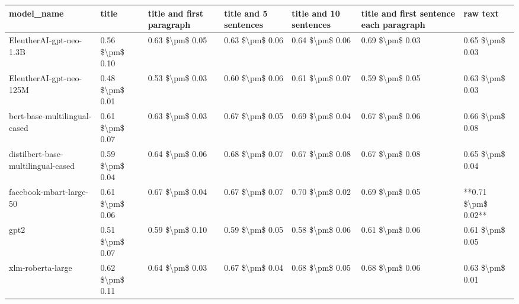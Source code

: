 \begin{tabular}{lllllll}
\toprule
                        model\_name &           title & title and first paragraph & title and 5 sentences & title and 10 sentences & title and first sentence each paragraph &            raw text \\
\midrule
           EleutherAI-gpt-neo-1.3B & 0.56 \$\textbackslash pm\$ 0.10 &           0.63 \$\textbackslash pm\$ 0.05 &       0.63 \$\textbackslash pm\$ 0.06 &        0.64 \$\textbackslash pm\$ 0.06 &                         0.69 \$\textbackslash pm\$ 0.03 &     0.65 \$\textbackslash pm\$ 0.03 \\
           EleutherAI-gpt-neo-125M & 0.48 \$\textbackslash pm\$ 0.01 &           0.53 \$\textbackslash pm\$ 0.03 &       0.60 \$\textbackslash pm\$ 0.06 &        0.61 \$\textbackslash pm\$ 0.07 &                         0.59 \$\textbackslash pm\$ 0.05 &     0.63 \$\textbackslash pm\$ 0.03 \\
      bert-base-multilingual-cased & 0.61 \$\textbackslash pm\$ 0.07 &           0.63 \$\textbackslash pm\$ 0.03 &       0.67 \$\textbackslash pm\$ 0.05 &        0.69 \$\textbackslash pm\$ 0.04 &                         0.67 \$\textbackslash pm\$ 0.06 &     0.66 \$\textbackslash pm\$ 0.08 \\
distilbert-base-multilingual-cased & 0.59 \$\textbackslash pm\$ 0.04 &           0.64 \$\textbackslash pm\$ 0.06 &       0.68 \$\textbackslash pm\$ 0.07 &        0.67 \$\textbackslash pm\$ 0.08 &                         0.67 \$\textbackslash pm\$ 0.08 &     0.65 \$\textbackslash pm\$ 0.04 \\
           facebook-mbart-large-50 & 0.61 \$\textbackslash pm\$ 0.06 &           0.67 \$\textbackslash pm\$ 0.04 &       0.67 \$\textbackslash pm\$ 0.07 &        0.70 \$\textbackslash pm\$ 0.02 &                         0.69 \$\textbackslash pm\$ 0.05 & **0.71 \$\textbackslash pm\$ 0.02** \\
                              gpt2 & 0.51 \$\textbackslash pm\$ 0.07 &           0.59 \$\textbackslash pm\$ 0.10 &       0.59 \$\textbackslash pm\$ 0.05 &        0.58 \$\textbackslash pm\$ 0.06 &                         0.61 \$\textbackslash pm\$ 0.06 &     0.61 \$\textbackslash pm\$ 0.05 \\
                 xlm-roberta-large & 0.62 \$\textbackslash pm\$ 0.11 &           0.64 \$\textbackslash pm\$ 0.03 &       0.67 \$\textbackslash pm\$ 0.04 &        0.68 \$\textbackslash pm\$ 0.05 &                         0.68 \$\textbackslash pm\$ 0.06 &     0.63 \$\textbackslash pm\$ 0.01 \\
\bottomrule
\end{tabular}
